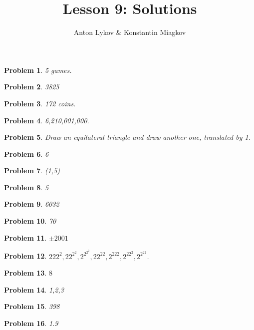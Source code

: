 \documentclass[a4paper,12pt]{article}
\author{Anton Lykov \& Konstantin Miagkov}
\title{Lesson 9: Solutions}
\theoremstyle{perfect}
\newtheorem{prb}{Problem}
\begin{document}
 
\maketitle

\begin{prb}
5 games.
\end{prb}

\begin{prb}
3825
\end{prb}

\begin{prb}
172 coins.
\end{prb}

\begin{prb}
6,210,001,000.
\end{prb}

\begin{prb}
Draw an equilateral triangle and draw another one, translated by 1.
\end{prb}

\begin{prb}
6
\end{prb}

\begin{prb}
(1,5)
\end{prb}


\begin{prb}
5
\end{prb}


\begin{prb}
6032
\end{prb}

\begin{prb}
70
\end{prb}

\begin{prb}
$\pm 2001$
\end{prb}

\begin{prb}
$222^2, 22^{2^2}, 2^{2^{2^2}}, 22^{22}, 2^{222}, 2^{22^2}, 2^{2^{22}}$.
\end{prb}

\begin{prb}
$8$
\end{prb}

\begin{prb}
1,2,3
\end{prb}

\begin{prb}
398
\end{prb}

\begin{prb}
1.9
\end{prb}
\end{document}
